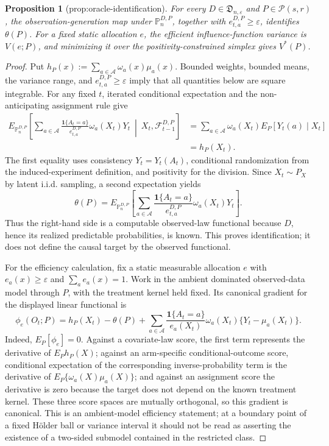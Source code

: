 \documentclass{article}
\newtheorem{proposition}{Proposition}
\begin{document}
\begin{proposition}[prop:oracle-identification]\label{prop:oracle-identification}
For every \(D\in\mathfrak D_{n,\varepsilon}\) and \(P\in\mathcal P(s,r)\), the observation-generation map under \(\mathbb P_n^{D,P}\), together with \(e_{t,a}^{D,P}\ge\varepsilon\), identifies \(\theta(P)\). For a fixed static allocation \(e\), the efficient influence-function variance is \(V(e;P)\), and minimizing it over the positivity-constrained simplex gives \(V^*(P)\).
\end{proposition}
\begin{proof}
Put \(h_P(x):=\sum_{a\in\mathcal A}\omega_a(x)\mu_a(x)\).  Bounded weights, bounded means, the variance range, and \(e_{t,a}^{D,P}\geq\varepsilon\) imply that all quantities below are square integrable.  For any fixed \(t\), iterated conditional expectation and the non-anticipating assignment rule give
\[
\begin{aligned}
E_{\mathbb P_n^{D,P}}\!\left[
 \sum_{a\in\mathcal A}
 \frac{\mathbf 1\{A_t=a\}}{e_{t,a}^{D,P}}
 \omega_a(X_t)Y_t
 \ \middle|\ X_t,\mathcal F_{t-1}^{D,P}
\right]
&=\sum_{a\in\mathcal A}\omega_a(X_t)
 E_P[Y_t(a)\mid X_t]\\
&=h_P(X_t).
\end{aligned}
\]
The first equality uses consistency \(Y_t=Y_t(A_t)\), conditional randomization from the induced-experiment definition, and positivity for the division.  Since \(X_t\sim P_X\) by latent i.i.d. sampling, a second expectation yields
\[
\theta(P)=E_{\mathbb P_n^{D,P}}\!\left[
 \sum_{a\in\mathcal A}
 \frac{\mathbf 1\{A_t=a\}}{e_{t,a}^{D,P}}
 \omega_a(X_t)Y_t
\right].
\]
Thus the right-hand side is a computable observed-law functional because \(D\), hence its realized predictable probabilities, is known.  This proves identification; it does not define the causal target by the observed functional.

For the efficiency calculation, fix a static measurable allocation \(e\) with \(e_a(x)\geq\varepsilon\) and \(\sum_a e_a(x)=1\).  Work in the ambient dominated observed-data model through \(P\), with the treatment kernel held fixed.  Its canonical gradient for the displayed linear functional is
\[
\phi_e(O_t;P)
=h_P(X_t)-\theta(P)
 +\sum_{a\in\mathcal A}
 \frac{\mathbf 1\{A_t=a\}}{e_a(X_t)}
 \omega_a(X_t)\{Y_t-\mu_a(X_t)\}.
\]
Indeed, \(E_P[\phi_e]=0\).  Against a covariate-law score, the first term represents the derivative of \(E_P h_P(X)\); against an arm-specific conditional-outcome score, conditional expectation of the corresponding inverse-probability term is the derivative of \(E_P\{\omega_a(X)\mu_a(X)\}\); and against an assignment score the derivative is zero because the target does not depend on the known treatment kernel.  These three score spaces are mutually orthogonal, so this gradient is canonical.  This is an ambient-model efficiency statement; at a boundary point of a fixed Hölder ball or variance interval it should not be read as asserting the existence of a two-sided submodel contained in the restricted class.


\end{proof}
\end{document}
